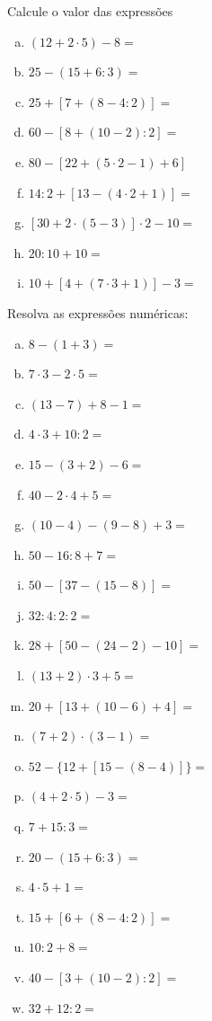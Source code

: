 \item Calcule o valor das expressões
\begin{multicols}{2}
\begin{enumerate}[a)]
	\item $(12 + 2 \cdot 5) - 8 =$
	\item $25 - ( 15 + 6 : 3) =$
	\item $25 +[7 + ( 8 - 4 :2)] =$
	\item $60 - [8 + ( 10 - 2 ) : 2] =$
	\item $80 - [ 22 + ( 5 \cdot 2 - 1 ) + 6] $
	\item $14 : 2 + [ 13 - ( 4 \cdot 2 + 1 ) ] =$
	\item $[ 30 + 2 \cdot  ( 5 - 3 ) ] \cdot  2 - 10 =$
	\item $20 : 10 + 10 =$
	\item $10 + [ 4 + ( 7 \cdot  3 + 1 ) ] - 3 =$
\end{enumerate}
\end{multicols}

\item  Resolva as expressões numéricas:
\begin{multicols}{2}
\begin{enumerate}[a)]
	\item $8 - ( 1 + 3) =$
	\item $7\cdot  3 - 2 \cdot  5 =$
	\item $( 13 - 7 ) + 8 - 1 =$
	\item $4 \cdot  3 + 10 : 2 =$
	\item $15 - ( 3 + 2 ) - 6 =$
	\item $40 - 2 \cdot  4 + 5 =$
	\item $( 10 - 4 ) - ( 9 - 8 ) + 3 =$
	\item $50 - 16 : 8 + 7 =$
	\item $50 - [37 - ( 15 - 8 ) ] = $
	\item $ 32 : 4 : 2 : 2 =$
	\item $28 + [ 50 - ( 24 - 2 ) - 10 ] =$
	\item $( 13 + 2) \cdot  3 + 5 =$
	\item $20 + [ 13 + ( 10 - 6 ) + 4 ] =$
	\item $( 7 + 2 ) \cdot  ( 3 - 1 ) =$
	\item $52 - \{ 12 + [ 15 - ( 8 - 4 )]\}=$
	\item $( 4 + 2 \cdot  5 ) - 3 =$
	\item $7 + 15 : 3 =$
	\item $20 - ( 15 + 6 : 3) =$
	\item $4 \cdot  5 + 1 =$
	\item $15 + [ 6 + ( 8 - 4 : 2 )] =$
	\item $10 : 2 + 8 =$
	\item $40 - [ 3 + (10 - 2 ) : 2 ] =$
	\item $ 32 + 12 : 2 =$
\end{enumerate}
\end{multicols}



